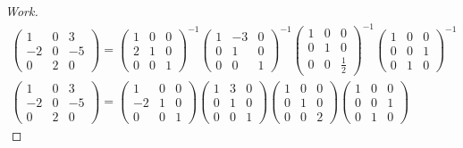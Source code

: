 \documentclass{article}
\begin{document}
\begin{proof}[Work]
\begin{align*}
    \begin{pmatrix}
      1  & 0 & 3  \\
      -2 & 0 & -5 \\
      0  & 2 & 0
    \end{pmatrix} =
    \begin{pmatrix}
      1 & 0 & 0 \\
      2 & 1 & 0 \\
      0 & 0 & 1
    \end{pmatrix}^{-1}
    \begin{pmatrix}
      1 & -3 & 0 \\
      0 & 1  & 0 \\
      0 & 0  & 1
    \end{pmatrix}^{-1}
    \begin{pmatrix}
      1 & 0 & 0           \\
      0 & 1 & 0           \\
      0 & 0 & \frac{1}{2}
    \end{pmatrix}^{-1}
    \begin{pmatrix}
      1 & 0 & 0 \\
      0 & 0 & 1 \\
      0 & 1 & 0
    \end{pmatrix}^{-1} \\
    \begin{pmatrix}
      1  & 0 & 3  \\
      -2 & 0 & -5 \\
      0  & 2 & 0
    \end{pmatrix} =
    \begin{pmatrix}
      1  & 0 & 0 \\
      -2 & 1 & 0 \\
      0  & 0 & 1
    \end{pmatrix}
    \begin{pmatrix}
      1 & 3 & 0 \\
      0 & 1 & 0 \\
      0 & 0 & 1
    \end{pmatrix}
    \begin{pmatrix}
      1 & 0 & 0 \\
      0 & 1 & 0 \\
      0 & 0 & 2
    \end{pmatrix}
    \begin{pmatrix}
      1 & 0 & 0 \\
      0 & 0 & 1 \\
      0 & 1 & 0
    \end{pmatrix}
  \end{align*}
\end{proof}
\qdash
\end{document}
